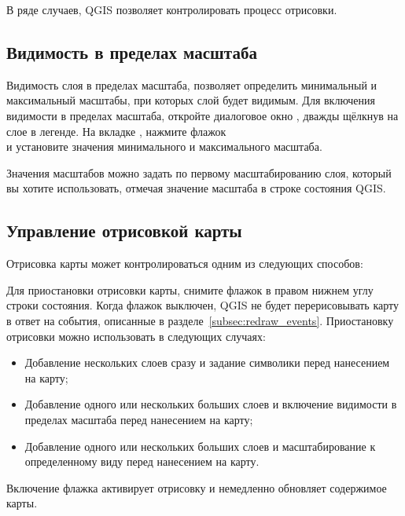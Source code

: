 В ряде случаев, QGIS позволяет контролировать процесс отрисовки.

\subsection{Видимость в пределах масштаба}
\label{label_scaledepend}

Видимость слоя в пределах масштаба, позволяет определить минимальный и
максимальный масштабы, при которых слой будет видимым. Для включения
видимости в пределах масштаба, откройте диалоговое окно ,
дважды щёлкнув на слое в легенде. На вкладке , нажмите флажок \\
 и установите значения минимального
и максимального масштаба.

Значения масштабов можно задать по первому масштабированию слоя, который
вы хотите использовать, отмечая значение масштаба в строке состояния QGIS.

\subsection{Управление отрисовкой карты}\label{label_controlmap}

Отрисовка карты может контролироваться одним из следующих способов:

\label{label_suspendrender}

Для приостановки отрисовки карты, снимите флажок 
в правом нижнем углу строки состояния. Когда флажок 
выключен, QGIS не будет перерисовывать карту в ответ на события,
описанные в разделе~\ref{subsec:redraw_events}. Приостановку отрисовки можно
использовать  в следующих случаях:

\begin{itemize}
\item Добавление нескольких слоев сразу и задание символики перед
нанесением на карту;
\item Добавление одного или нескольких больших слоев и включение видимости
в пределах масштаба перед нанесением на карту;
\item Добавление одного или нескольких больших слоев и масштабирование
к определенному виду перед нанесением на карту.
\end{itemize}

Включение флажка  активирует отрисовку и немедленно
обновляет содержимое карты.

